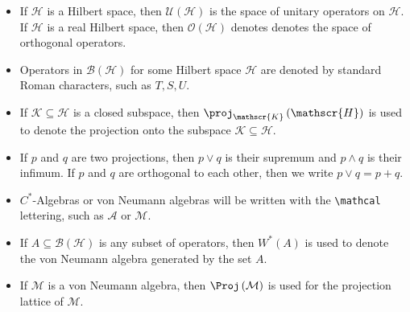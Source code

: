 \documentclass[10pt]{mypackage}
\begin{document}
\begin{itemize}
  \item If $\mathscr{H}$ is a Hilbert space, then $ \mathcal{U}\left( \mathscr{H} \right) $ is the space of unitary operators on $ \mathscr{H} $. If $ \mathscr{H} $ is a real Hilbert space, then $ \mathcal{O}\left( \mathscr{H} \right) $ denotes denotes the space of orthogonal operators.
  \item Operators in $ \mathcal{B}\left( \mathscr{H} \right) $ for some Hilbert space $ \mathscr{H} $ are denoted by standard Roman characters, such as $T,S,U$.
  \item If $ \mathscr{K}\subseteq \mathscr{H} $ is a closed subspace, then $\proj_{\mathscr{K}}\left( \mathscr{H} \right)$ is used to denote the projection onto the subspace $ \mathscr{K} \subseteq \mathscr{H}$.
  \item If $p$ and $q$ are two projections, then $p\vee q$ is their supremum and $p\wedge q$ is their infimum. If $p$ and $q$ are orthogonal to each other, then we write $p\vee q = p + q$.
  \item $C^{\ast}$-Algebras or von Neumann algebras will be written with the \verb|\mathcal| lettering, such as $ \mathcal{A} $ or $\mathcal{M}$.
  \item If $A\subseteq \mathcal{B}\left( \mathscr{H} \right)$ is any subset of operators, then $W^{\ast}\left( A \right)$ is used to denote the von Neumann algebra generated by the set $A$.
  \item If $ \mathcal{M} $ is a von Neumann algebra, then $\Proj\left( \mathcal{M} \right)$ is used for the projection lattice of $\mathcal{M}$.
\end{itemize}
\end{document}
